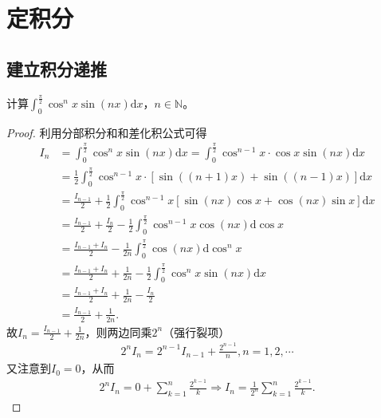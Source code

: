 \documentclass[../../main.tex]{subfiles}
\begin{document}
\section{定积分}

\subsection{建立积分递推}

\begin{example}
计算\(\int_{0}^{\frac{\pi}{2}} \cos^{n}x\sin(nx)\mathrm{d}x\)，\(n \in \mathbb{N}\)。 
\end{example}
\begin{proof}
利用分部积分和和差化积公式可得
\begin{align*}
I_n&=\int_0^{\frac{\pi}{2}}\cos ^nx\sin(nx) \mathrm{d}x=\int_0^{\frac{\pi}{2}}\cos ^{n - 1}x\cdot\cos x\sin(nx) \mathrm{d}x\\
&=\frac{1}{2}\int_0^{\frac{\pi}{2}}\cos ^{n - 1}x\cdot[\sin((n + 1)x)+\sin((n - 1)x)] \mathrm{d}x\\
&=\frac{I_{n - 1}}{2}+\frac{1}{2}\int_0^{\frac{\pi}{2}}\cos ^{n - 1}x[\sin(nx)\cos x+\cos(nx)\sin x] \mathrm{d}x\\
&=\frac{I_{n - 1}}{2}+\frac{I_n}{2}-\frac{1}{2}\int_0^{\frac{\pi}{2}}\cos ^{n - 1}x\cos(nx) \mathrm{d}\cos x\\
&=\frac{I_{n - 1}+I_n}{2}-\frac{1}{2n}\int_0^{\frac{\pi}{2}}\cos(nx) \mathrm{d}\cos ^nx\\
&=\frac{I_{n - 1}+I_n}{2}+\frac{1}{2n}-\frac{1}{2}\int_0^{\frac{\pi}{2}}\cos ^nx\sin(nx) \mathrm{d}x\\
&=\frac{I_{n - 1}+I_n}{2}+\frac{1}{2n}-\frac{I_n}{2}\\
&=\frac{I_{n - 1}}{2}+\frac{1}{2n}.
\end{align*}
故\(I_n=\frac{I_{n - 1}}{2}+\frac{1}{2n}\)，则两边同乘\(2^n\)（强行裂项）
\begin{align*}
2^nI_n = 2^{n - 1}I_{n - 1}+\frac{2^{n - 1}}{n},n = 1,2,\cdots
\end{align*}
又注意到\(I_0 = 0\)，从而
\begin{align*}
2^nI_n = 0+\sum_{k = 1}^n\frac{2^{k - 1}}{k}\Rightarrow I_n=\frac{1}{2^n}\sum_{k = 1}^n\frac{2^{k - 1}}{k}.
\end{align*}
\end{proof}
\end{document}
